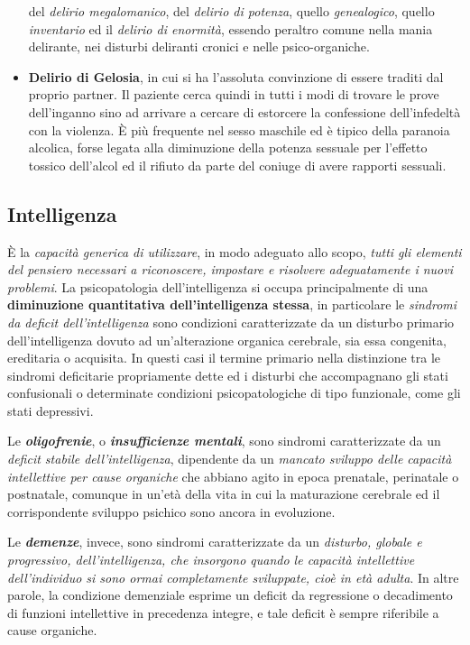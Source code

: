 \begin{itemize}
  del \emph{delirio megalomanico}, del \emph{delirio di potenza}, quello
  \emph{genealogico}, quello \emph{inventario} ed il \emph{delirio di
  enormità}, essendo peraltro comune nella mania delirante, nei disturbi
  deliranti cronici e nelle psico-organiche.
\item
  \textbf{Delirio di Gelosia}, in cui si ha l'assoluta convinzione di
  essere traditi dal proprio partner. Il paziente cerca quindi in tutti
  i modi di trovare le prove dell'inganno sino ad arrivare a cercare di
  estorcere la confessione dell'infedeltà con la violenza. È più
  frequente nel sesso maschile ed è tipico della paranoia alcolica,
  forse legata alla diminuzione della potenza sessuale per l'effetto
  tossico dell'alcol ed il rifiuto da parte del coniuge di avere
  rapporti sessuali.
\end{itemize}

\subsection{Intelligenza}

È la \emph{capacità generica di utilizzare}, in modo adeguato allo
scopo, \emph{tutti gli elementi del pensiero necessari a riconoscere,
impostare e risolvere adeguatamente i nuovi problemi}. La psicopatologia
dell'intelligenza si occupa principalmente di una \textbf{diminuzione
quantitativa dell'intelligenza stessa}, in particolare le \emph{sindromi
da deficit dell'intelligenza} sono condizioni caratterizzate da un
disturbo primario dell'intelligenza dovuto ad un'alterazione organica
cerebrale, sia essa congenita, ereditaria o acquisita. In questi casi il
termine primario nella distinzione tra le sindromi deficitarie
propriamente dette ed i disturbi che accompagnano gli stati confusionali
o determinate condizioni psicopatologiche di tipo funzionale, come gli
stati depressivi.

Le \textbf{\emph{oligofrenie}}, o \textbf{\emph{insufficienze mentali}},
sono sindromi caratterizzate da un \emph{deficit stabile
dell'intelligenza}, dipendente da un \emph{mancato sviluppo delle
capacità intellettive per cause organiche} che abbiano agito in epoca
prenatale, perinatale o postnatale, comunque in un'età della vita in cui
la maturazione cerebrale ed il corrispondente sviluppo psichico sono
ancora in evoluzione.

Le \textbf{\emph{demenze}}, invece, sono sindromi caratterizzate da un
\emph{disturbo, globale e progressivo, dell'intelligenza, che insorgono
quando le capacità intellettive dell'individuo si sono ormai
completamente sviluppate, cioè in età adulta}. In altre parole, la
condizione demenziale esprime un deficit da regressione o decadimento di
funzioni intellettive in precedenza integre, e tale deficit è sempre
riferibile a cause organiche.

